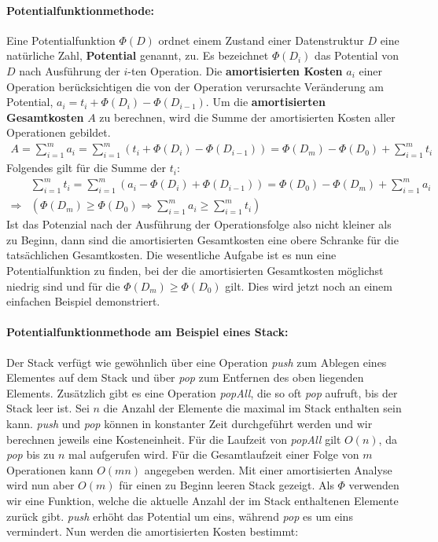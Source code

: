 \documentclass[a4paper,12pt]{article}
\begin{document}
\paragraph{Potentialfunktionmethode:} \label{potentialfunktionsmethode} Eine Potentialfunktion $\Phi(D)$ ordnet einem Zustand einer Datenstruktur $D$ eine natürliche Zahl, \textbf{Potential} genannt, zu. Es bezeichnet $\Phi(D_i)$ das Potential von $D$ nach Ausführung der $i$-ten Operation. Die \textbf{amortisierten Kosten} $a_i$ einer Operation berücksichtigen die von der Operation verursachte Veränderung am Potential, \mbox{$a_i = t_i + \Phi(D_{i}) - \Phi(D_{i-1})$}. Um die \textbf{amortisierten Gesamtkosten} $A$ zu berechnen, wird die Summe der amortisierten Kosten aller Operationen gebildet. 
\begin{align*}
A = \sum_{i = 1}^{m} a_i =  \sum_{i = 1}^{m} \left(t_i + \Phi\left(D_{i}\right) - \Phi\left(D_{i-1}\right)\right) = \Phi\left(D_{m}\right) - \Phi\left(D_{0}\right) + \sum_{i = 1}^{m} t_i 
\end{align*}
Folgendes gilt für die Summe der $t_i$:
\begin{align*}
&\sum_{i = 1}^{m} t_i =  \sum_{i = 1}^{m} \left(a_i - \Phi\left(D_{i}\right) + \Phi\left(D_{i-1}\right)\right) = \Phi\left(D_{0}\right) - \Phi\left(D_{m}\right) + \sum_{i = 1}^{m} a_i \\
\Rightarrow &\left( \Phi\left(D_{m}\right) \geq \Phi\left(D_{0}\right) \Rightarrow \sum_{i = 1}^{m} a_i \geq \sum_{i = 1}^{m} t_i \right)
\end{align*}
Ist das Potenzial nach der Ausführung der Operationsfolge also nicht kleiner als zu Beginn, dann sind die amortisierten Gesamtkosten eine obere Schranke für die tatsächlichen Gesamtkosten. Die wesentliche Aufgabe ist es nun eine Potentialfunktion zu finden, bei der die amortisierten Gesamtkosten möglichst niedrig sind und für die $\Phi\left(D_{m}\right) \geq \Phi\left(D_{0}\right)$ gilt. Dies wird jetzt noch an einem einfachen Beispiel demonstriert.

\paragraph{Potentialfunktionmethode am Beispiel eines Stack:} 
Der Stack verfügt wie gewöhnlich über eine Operation \textit{push} zum Ablegen eines Elementes auf dem Stack und über \textit{pop} zum Entfernen des oben liegenden Elements. Zusätzlich gibt es eine Operation \textit{popAll}, die so oft \textit{pop} aufruft, bis der Stack leer ist. Sei $n$ die Anzahl der Elemente die maximal im Stack enthalten sein kann. \textit{push} und \textit{pop} können in konstanter Zeit durchgeführt werden und wir berechnen jeweils eine Kosteneinheit. Für die Laufzeit von \textit{popAll} gilt $O(n)$, da \textit{pop} bis zu $n$ mal aufgerufen wird. Für die Gesamtlaufzeit einer Folge von $m$ Operationen kann $O(mn)$ angegeben werden. Mit einer amortisierten Analyse wird nun aber $O(m)$ für einen zu Beginn leeren Stack gezeigt. Als $\Phi$ verwenden wir eine Funktion, welche die aktuelle Anzahl der im Stack enthaltenen Elemente zurück gibt. \textit{push} erhöht das Potential um eins, während \textit{pop} es um eins vermindert. Nun werden die amortisierten Kosten bestimmt: 
\end{document}
